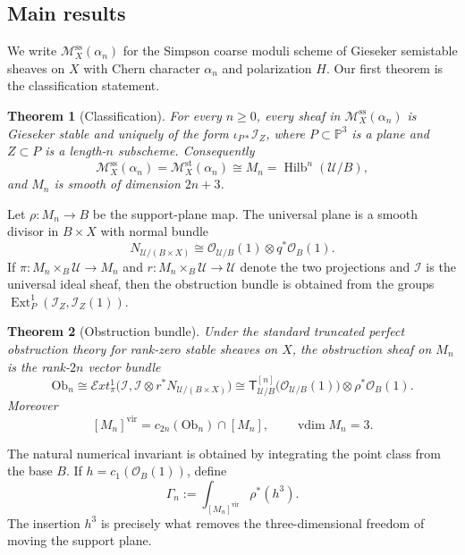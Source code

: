 \documentclass[12pt]{amsart}
\numberwithin{equation}{section}
\newcommand{\PP}{\mathbb{P}}
\newcommand{\OO}{\mathcal{O}}
\newcommand{\I}{\mathcal{I}}
\newcommand{\M}{\mathcal{M}}
\newcommand{\Hilb}{\operatorname{Hilb}}
\newcommand{\Ext}{\operatorname{Ext}}
\newcommand{\vdim}{\operatorname{vdim}}
\newcommand{\Ttw}{\mathsf{T}}
\newcommand{\vfc}[1]{[#1]^{\mathrm{vir}}}
\theoremstyle{plain}
\newtheorem{theorem}{Theorem}[section]
\theoremstyle{definition}
\theoremstyle{remark}
\begin{document}
\subsection{Main results}
We write $\M_X^{\mathrm{ss}}(\alpha_n)$ for the Simpson coarse moduli scheme of Gieseker semistable sheaves on $X$ with Chern character $\alpha_n$ and polarization $H$.
Our first theorem is the classification statement.

\begin{theorem}[Classification]\label{thm:A}
For every $n\ge 0$, every sheaf in $\M_X^{\mathrm{ss}}(\alpha_n)$ is Gieseker stable and uniquely of the form $\iota_{P*}\I_Z$, where $P\subset \PP^3$ is a plane and $Z\subset P$ is a length-$n$ subscheme.
Consequently
\[
\M_X^{\mathrm{ss}}(\alpha_n)=\M_X^{\mathrm{st}}(\alpha_n)\cong M_n=\Hilb^n(\mathcal U/B),
\]
and $M_n$ is smooth of dimension $2n+3$.
\end{theorem}

Let $\rho\colon M_n\to B$ be the support-plane map.
The universal plane is a smooth divisor in $B\times X$ with normal bundle
\begin{equation}\label{eq:intro-normal}
N_{\mathcal U/(B\times X)}\cong \OO_{\mathcal U/B}(1)\otimes q^*\OO_B(1).
\end{equation}
If $\pi\colon M_n\times_B\mathcal U\to M_n$ and $r\colon M_n\times_B\mathcal U\to\mathcal U$ denote the two projections and $\mathcal I$ is the universal ideal sheaf, then the obstruction bundle is obtained from the groups $\Ext^1_P(\I_Z,\I_Z(1))$.

\begin{theorem}[Obstruction bundle]\label{thm:B}
Under the standard truncated perfect obstruction theory for rank-zero stable sheaves on $X$, the obstruction sheaf on $M_n$ is the rank-$2n$ vector bundle
\[
\mathrm{Ob}_n\cong \mathcal Ext^1_{\pi}\bigl(\mathcal I,\mathcal I\otimes r^*N_{\mathcal U/(B\times X)}\bigr)
\cong
\Ttw_{\mathcal U/B}^{[n]}\bigl(\OO_{\mathcal U/B}(1)\bigr)\otimes \rho^*\OO_B(1).
\]
Moreover
\[
\vfc{M_n}=c_{2n}(\mathrm{Ob}_n)\cap [M_n],
\qquad
\vdim M_n=3.
\]
\end{theorem}

The natural numerical invariant is obtained by integrating the point class from the base $B$.
If $h=c_1(\OO_B(1))$, define
\begin{equation}\label{eq:intro-gamma}
\Gamma_n:=\int_{\vfc{M_n}}\rho^*(h^3).
\end{equation}
The insertion $h^3$ is precisely what removes the three-dimensional freedom of moving the support plane.
\end{document}
